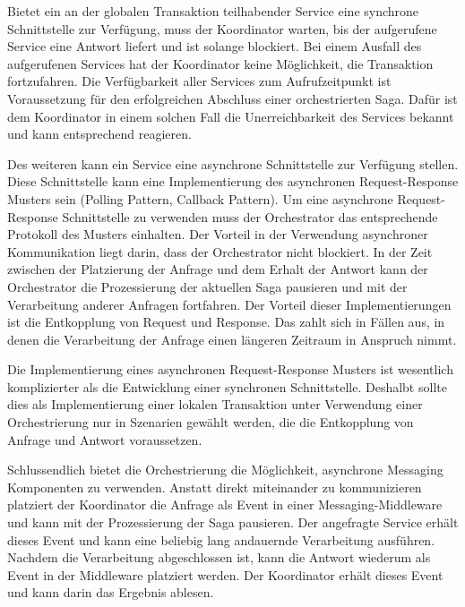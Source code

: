 Bietet ein an der globalen Transaktion teilhabender Service eine synchrone Schnittstelle zur Verfügung, muss der Koordinator warten, bis der aufgerufene Service eine Antwort liefert und ist solange blockiert. Bei einem Ausfall des aufgerufenen Services hat der Koordinator keine Möglichkeit, die Transaktion fortzufahren. Die Verfügbarkeit aller Services zum Aufrufzeitpunkt ist Voraussetzung für den erfolgreichen Abschluss einer orchestrierten Saga. Dafür ist dem Koordinator in einem solchen Fall die Unerreichbarkeit des Services bekannt und kann entsprechend reagieren. 

Des weiteren kann ein Service eine asynchrone Schnittstelle zur Verfügung stellen. Diese Schnittstelle kann eine Implementierung des asynchronen Request-Response Musters sein (Polling Pattern, Callback Pattern). Um eine asynchrone Request-Response Schnittstelle zu verwenden muss der Orchestrator das entsprechende Protokoll des Musters einhalten. Der Vorteil in der Verwendung asynchroner Kommunikation liegt darin, dass der Orchestrator nicht blockiert. In der Zeit zwischen der Platzierung der Anfrage und dem Erhalt der Antwort kann der Orchestrator die Prozessierung der aktuellen Saga pausieren und mit der Verarbeitung anderer Anfragen fortfahren. Der Vorteil dieser Implementierungen ist die Entkopplung von Request und Response. Das zahlt sich in Fällen aus, in denen die Verarbeitung der Anfrage einen längeren Zeitraum in Anspruch nimmt.  

Die Implementierung eines asynchronen Request-Response Musters ist wesentlich komplizierter als die Entwicklung einer synchronen Schnittstelle. Deshalbt sollte dies als Implementierung einer lokalen Transaktion unter Verwendung einer Orchestrierung nur in Szenarien gewählt werden, die die Entkopplung von Anfrage und Antwort voraussetzen.

Schlussendlich bietet die Orchestrierung die Möglichkeit, asynchrone Messaging Komponenten zu verwenden. Anstatt direkt miteinander zu kommunizieren platziert der Koordinator die Anfrage als Event in einer Messaging-Middleware und kann mit der Prozessierung der Saga pausieren. Der angefragte Service erhält dieses Event und kann eine beliebig lang andauernde Verarbeitung ausführen. Nachdem die Verarbeitung abgeschlossen ist, kann die Antwort wiederum als Event in der Middleware platziert werden. Der Koordinator erhält dieses Event und kann darin das Ergebnis ablesen.

